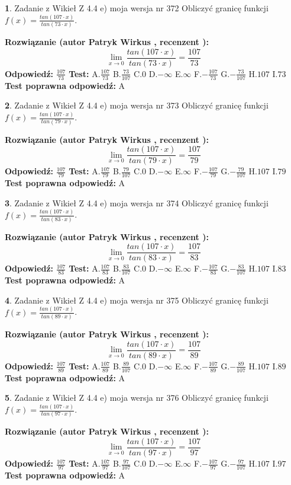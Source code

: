 \documentclass[12pt, a4paper]{article}
\theoremstyle{definition} %
\newtheorem{zad}{}
\newcommand{\zadStart}[1]{\begin{zad}#1\newline}
\newcommand{\zadStop}{\end{zad}}
\newcommand{\rozwStart}[2]{\noindent \textbf{Rozwiązanie (autor #1 , recenzent #2): }\newline}
\newcommand{\rozwStop}{\newline}
\newcommand{\odpStart}{\noindent \textbf{Odpowiedź:}\newline}
\newcommand{\odpStop}{\newline}
\newcommand{\testStart}{\noindent \textbf{Test:}\newline}
\newcommand{\testStop}{\newline}
\newcommand{\kluczStart}{\noindent \textbf{Test poprawna odpowiedź:}\newline}
\newcommand{\kluczStop}{\newline}
\begin{document}
\zadStart{Zadanie z Wikieł Z 4.4 e) moja wersja nr 372}
Obliczyć granicę funkcji $f(x)=\frac{tan(107\cdot x)}{tan(73\cdot x)}$.
\zadStop
\rozwStart{Patryk Wirkus}{}
$$\lim\limits_{x\to 0}\frac{tan(107\cdot x)}{tan(73\cdot x)}=
\frac{107}{73}$$
\rozwStop
\odpStart
$\frac{107}{73}$
\odpStop
\testStart
A.$\frac{107}{73}$
B.$\frac{73}{107}$
C.$0$
D.$-\infty$
E.$\infty$
F.$-\frac{107}{73}$
G.$-\frac{73}{107}$
H.$107$
I.$73$
\testStop
\kluczStart
A
\kluczStop



\zadStart{Zadanie z Wikieł Z 4.4 e) moja wersja nr 373}
Obliczyć granicę funkcji $f(x)=\frac{tan(107\cdot x)}{tan(79\cdot x)}$.
\zadStop
\rozwStart{Patryk Wirkus}{}
$$\lim\limits_{x\to 0}\frac{tan(107\cdot x)}{tan(79\cdot x)}=
\frac{107}{79}$$
\rozwStop
\odpStart
$\frac{107}{79}$
\odpStop
\testStart
A.$\frac{107}{79}$
B.$\frac{79}{107}$
C.$0$
D.$-\infty$
E.$\infty$
F.$-\frac{107}{79}$
G.$-\frac{79}{107}$
H.$107$
I.$79$
\testStop
\kluczStart
A
\kluczStop



\zadStart{Zadanie z Wikieł Z 4.4 e) moja wersja nr 374}
Obliczyć granicę funkcji $f(x)=\frac{tan(107\cdot x)}{tan(83\cdot x)}$.
\zadStop
\rozwStart{Patryk Wirkus}{}
$$\lim\limits_{x\to 0}\frac{tan(107\cdot x)}{tan(83\cdot x)}=
\frac{107}{83}$$
\rozwStop
\odpStart
$\frac{107}{83}$
\odpStop
\testStart
A.$\frac{107}{83}$
B.$\frac{83}{107}$
C.$0$
D.$-\infty$
E.$\infty$
F.$-\frac{107}{83}$
G.$-\frac{83}{107}$
H.$107$
I.$83$
\testStop
\kluczStart
A
\kluczStop



\zadStart{Zadanie z Wikieł Z 4.4 e) moja wersja nr 375}
Obliczyć granicę funkcji $f(x)=\frac{tan(107\cdot x)}{tan(89\cdot x)}$.
\zadStop
\rozwStart{Patryk Wirkus}{}
$$\lim\limits_{x\to 0}\frac{tan(107\cdot x)}{tan(89\cdot x)}=
\frac{107}{89}$$
\rozwStop
\odpStart
$\frac{107}{89}$
\odpStop
\testStart
A.$\frac{107}{89}$
B.$\frac{89}{107}$
C.$0$
D.$-\infty$
E.$\infty$
F.$-\frac{107}{89}$
G.$-\frac{89}{107}$
H.$107$
I.$89$
\testStop
\kluczStart
A
\kluczStop



\zadStart{Zadanie z Wikieł Z 4.4 e) moja wersja nr 376}
Obliczyć granicę funkcji $f(x)=\frac{tan(107\cdot x)}{tan(97\cdot x)}$.
\zadStop
\rozwStart{Patryk Wirkus}{}
$$\lim\limits_{x\to 0}\frac{tan(107\cdot x)}{tan(97\cdot x)}=
\frac{107}{97}$$
\rozwStop
\odpStart
$\frac{107}{97}$
\odpStop
\testStart
A.$\frac{107}{97}$
B.$\frac{97}{107}$
C.$0$
D.$-\infty$
E.$\infty$
F.$-\frac{107}{97}$
G.$-\frac{97}{107}$
H.$107$
I.$97$
\testStop
\kluczStart
A
\kluczStop
\end{document}
